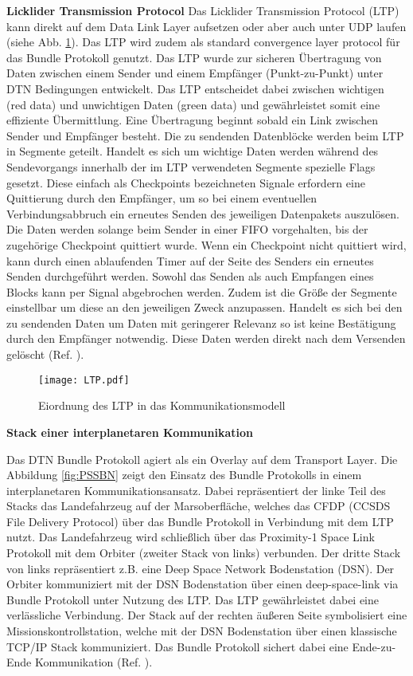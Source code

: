 \textbf{Licklider Transmission Protocol}
Das Licklider Transmission Protocol (LTP) kann direkt auf dem Data Link Layer
aufsetzen oder aber auch unter UDP laufen (siehe Abb. \ref{fig:LTP}). Das LTP
wird zudem als standard convergence layer protocol f{\"u}r das Bundle Protokoll
genutzt. Das LTP wurde zur sicheren {\"U}bertragung von Daten zwischen einem
Sender und einem Empf{\"a}nger (Punkt-zu-Punkt) unter DTN Bedingungen
entwickelt. Das LTP entscheidet dabei zwischen wichtigen (red data) und
unwichtigen Daten (green data) und gew{\"a}hrleistet somit eine effiziente
{\"U}bermittlung. Eine {\"U}bertragung beginnt sobald ein Link zwischen Sender
und Empf{\"a}nger besteht. Die zu sendenden Datenbl{\"o}cke werden beim LTP in
Segmente geteilt. Handelt es sich um wichtige Daten werden
w{\"a}hrend des Sendevorgangs innerhalb der im LTP verwendeten Segmente
spezielle Flags gesetzt.
Diese einfach als Checkpoints bezeichneten Signale erfordern eine Quittierung
durch den Empf{\"a}nger, um so bei einem eventuellen Verbindungsabbruch ein
erneutes Senden des jeweiligen Datenpakets auszul{\"o}sen. Die Daten werden
solange beim Sender in einer FIFO vorgehalten, bis der zugeh{\"o}rige
Checkpoint quittiert wurde. Wenn ein Checkpoint nicht quittiert wird, kann durch
einen ablaufenden Timer auf der Seite des Senders ein erneutes Senden
durchgeführt werden. Sowohl das Senden als auch Empfangen eines Blocks kann per
Signal abgebrochen werden. Zudem ist die Gr{\"o}{\ss}e der Segmente einstellbar um
diese an den jeweiligen Zweck anzupassen. Handelt es sich bei den zu sendenden
Daten um Daten mit geringerer Relevanz so ist keine
Best{\"a}tigung durch den Empf{\"a}nger notwendig.
Diese Daten werden direkt nach dem Versenden gel{\"o}scht (Ref. \cite{web4}).

\begin{figure}[H]
\centering
\texttt{[image: LTP.pdf]}
\caption{Eiordnung des LTP in das Kommunikationsmodell}
\label{fig:LTP}
\end{figure}

\textbf{Stack einer interplanetaren Kommunikation}

Das DTN Bundle Protokoll agiert als ein Overlay  auf dem Transport Layer. Die Abbildung \ref{fig:PSSBN} zeigt den
Einsatz des Bundle Protokolls in einem interplanetaren Kommunikationsansatz.
Dabei repr{\"a}sentiert der linke Teil des Stacks das Landefahrzeug auf der
Marsoberfl{\"a}che, welches das CFDP (CCSDS File Delivery Protocol) {\"u}ber das
Bundle Protokoll in Verbindung mit dem LTP nutzt.
Das Landefahrzeug wird schlie{\ss}lich {\"u}ber das Proximity-1 Space Link
Protokoll mit dem Orbiter (zweiter Stack von links) verbunden. Der dritte Stack
von links repr{\"a}sentiert z.B. eine Deep Space Network Bodenstation (DSN). Der
Orbiter kommuniziert mit der DSN Bodenstation {\"u}ber einen deep-space-link via
Bundle Protokoll unter Nutzung des LTP. Das LTP gew{\"a}hrleistet dabei eine
verl{\"a}ssliche Verbindung. Der Stack auf der rechten {\"a}u{\ss}eren Seite
symbolisiert eine Missionskontrollstation, welche mit der DSN Bodenstation
{\"u}ber einen klassische TCP/IP Stack kommuniziert. Das Bundle Protokoll
sichert dabei eine Ende-zu-Ende Kommunikation (Ref. \cite{DTNBundle}).


